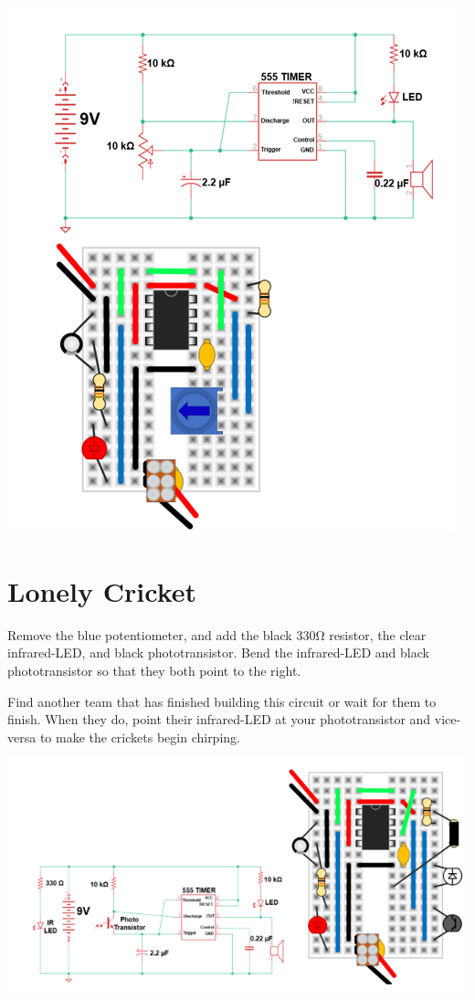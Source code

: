 \documentclass[
]{book}
\begin{document}
\includegraphics{images/cricket_diagram.png}

\hypertarget{lonely-cricket}{%
\chapter{Lonely Cricket}\label{lonely-cricket}}

Remove the blue potentiometer, and add the black 330Ω resistor, the clear infrared-LED, and black phototransistor. Bend the infrared-LED and black phototransistor so that they both point to the right.

Find another team that has finished building this circuit or wait for them to finish. When they do, point their infrared-LED at your phototransistor and vice-versa to make the crickets begin chirping.

\includegraphics{images/lonely_cricket_diagram.png}

  
\end{document}
